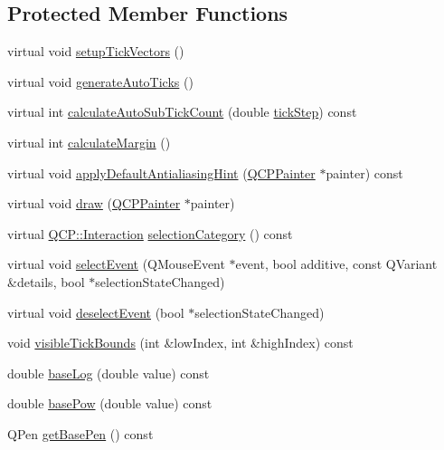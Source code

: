 \subsection*{Protected Member Functions}
\begin{DoxyCompactItemize}
\item 
virtual void \hyperlink{class_q_c_p_axis_a57d9e961bae7d62f5b4e1f143e660c78}{setup\+Tick\+Vectors} ()
\item 
virtual void \hyperlink{class_q_c_p_axis_a626eef437c874148df1a5ac78506d463}{generate\+Auto\+Ticks} ()
\item 
virtual int \hyperlink{class_q_c_p_axis_a3c5c045019fcdc0843a3e064eda7478a}{calculate\+Auto\+Sub\+Tick\+Count} (double \hyperlink{class_q_c_p_axis_a0e6120d24266544441ab691f316a1b03}{tick\+Step}) const 
\item 
virtual int \hyperlink{class_q_c_p_axis_a47bdb0a55de6759489ee47665199aebb}{calculate\+Margin} ()
\item 
virtual void \hyperlink{class_q_c_p_axis_a13bde39eb1e0b7c14a02935689be8aba}{apply\+Default\+Antialiasing\+Hint} (\hyperlink{class_q_c_p_painter}{Q\+C\+P\+Painter} $\ast$painter) const 
\item 
virtual void \hyperlink{class_q_c_p_axis_a258b1e783eda5cd14ec5552c696a424e}{draw} (\hyperlink{class_q_c_p_painter}{Q\+C\+P\+Painter} $\ast$painter)
\item 
virtual \hyperlink{namespace_q_c_p_a2ad6bb6281c7c2d593d4277b44c2b037}{Q\+C\+P\+::\+Interaction} \hyperlink{class_q_c_p_axis_aca53b2f365dfc1257cba9e62395aa68f}{selection\+Category} () const 
\item 
virtual void \hyperlink{class_q_c_p_axis_aa8a5fe80e2898ec08ada26b5fbee9eca}{select\+Event} (Q\+Mouse\+Event $\ast$event, bool additive, const Q\+Variant \&details, bool $\ast$selection\+State\+Changed)
\item 
virtual void \hyperlink{class_q_c_p_axis_a53512242cde6ec21943a3ba10dbf78c3}{deselect\+Event} (bool $\ast$selection\+State\+Changed)
\item 
void \hyperlink{class_q_c_p_axis_a06320a944d1120732cc0d72fe1306d8b}{visible\+Tick\+Bounds} (int \&low\+Index, int \&high\+Index) const 
\item 
double \hyperlink{class_q_c_p_axis_a1385765db2419ee5fb5505a6cf9130fb}{base\+Log} (double value) const 
\item 
double \hyperlink{class_q_c_p_axis_a97d69f021a05126fcb978d0aefea47b8}{base\+Pow} (double value) const 
\item 
Q\+Pen \hyperlink{class_q_c_p_axis_a3eb0681d31baf579bb73b86a0153cb02}{get\+Base\+Pen} () const 

\end{DoxyCompactItemize}
